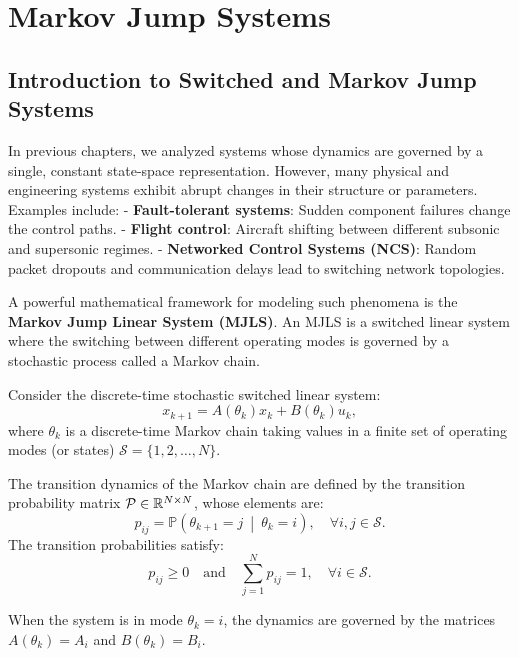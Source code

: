 \chapter{Markov Jump Systems}

\section{Introduction to Switched and Markov Jump Systems}
In previous chapters, we analyzed systems whose dynamics are governed by a single, constant state-space representation. However, many physical and engineering systems exhibit abrupt changes in their structure or parameters. Examples include:
- \textbf{Fault-tolerant systems}: Sudden component failures change the control paths.
- \textbf{Flight control}: Aircraft shifting between different subsonic and supersonic regimes.
- \textbf{Networked Control Systems (NCS)}: Random packet dropouts and communication delays lead to switching network topologies.

A powerful mathematical framework for modeling such phenomena is the \textbf{Markov Jump Linear System (MJLS)}. An MJLS is a switched linear system where the switching between different operating modes is governed by a stochastic process called a Markov chain.

Consider the discrete-time stochastic switched linear system:
\begin{equation}
    x_{k+1} = A(\theta_k) x_k + B(\theta_k) u_k , \label{eq:mjls_system}
\end{equation}
where $\theta_k$ is a discrete-time Markov chain taking values in a finite set of operating modes (or states) $\mathcal{S} = \{1, 2, \dots, N\}$.

The transition dynamics of the Markov chain are defined by the transition probability matrix $\mathcal{P} \in \mathbb{R}^{N \times N}$, whose elements are:
\begin{equation}
p_{ij} = \mathbb{P}\left(\theta_{k+1} = j \ \middle| \ \theta_k = i\right), \quad \forall i, j \in \mathcal{S} .
\end{equation}
The transition probabilities satisfy:
\begin{equation}
p_{ij} \ge 0 \quad \text{and} \quad \sum_{j=1}^N p_{ij} = 1, \quad \forall i \in \mathcal{S} .
\end{equation}

When the system is in mode $\theta_k = i$, the dynamics are governed by the matrices $A(\theta_k) = A_i$ and $B(\theta_k) = B_i$.

